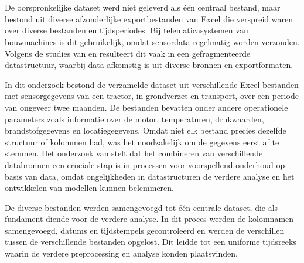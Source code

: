 \section{}%
\label{sec: structuur van de verkregen werkelijke data} 

De oorspronkelijke dataset werd niet geleverd als één centraal bestand, maar bestond uit diverse afzonderlijke exportbestanden van Excel die verspreid waren over diverse bestanden en tijdsperiodes. Bij telematicasystemen van bouwmachines is dit gebruikelijk, omdat sensordata regelmatig worden verzonden. Volgens de studies van \textcite{Elahi2023} en \textcite{Mahale2025} resulteert dit vaak in een gefragmenteerde datastructuur, waarbij data afkomstig is uit diverse bronnen en exportformaten.


In dit onderzoek bestond de verzamelde dataset uit verschillende Excel-bestanden met sensorgegevens van een tractor, in grondverzet en transport, over een periode van ongeveer twee maanden. De bestanden bevatten onder andere operationele parameters zoals informatie over de motor, temperaturen, drukwaarden, brandstofgegevens en locatiegegevens. Omdat niet elk bestand precies dezelfde structuur of kolommen had, was het noodzakelijk om de gegevens eerst af te stemmen. Het onderzoek van \textcite{Carvalho2019} stelt dat het combineren van verschillende databronnen een cruciale stap is in processen voor voorspellend onderhoud op basis van data, omdat ongelijkheden in datastructuren de verdere analyse en het ontwikkelen van modellen kunnen belemmeren.

De diverse bestanden werden samengevoegd tot één centrale dataset, die als fundament diende voor de verdere analyse. In dit proces werden de kolomnamen samengevoegd, datums en tijdstempels gecontroleerd en werden de verschillen tussen de verschillende bestanden opgelost. Dit leidde tot een uniforme tijdsreeks waarin de verdere preprocessing en analyse konden plaatsvinden.


